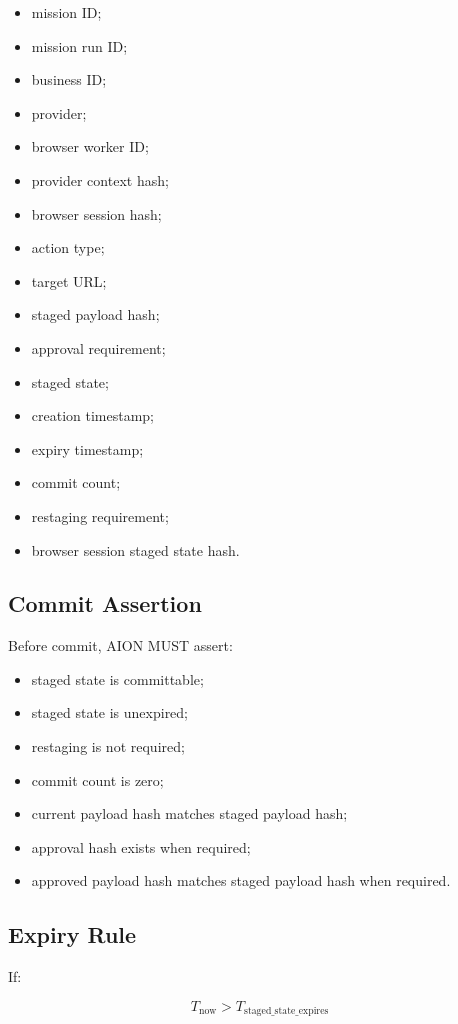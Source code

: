 \begin{itemize}
  \item mission ID;
  \item mission run ID;
  \item business ID;
  \item provider;
  \item browser worker ID;
  \item provider context hash;
  \item browser session hash;
  \item action type;
  \item target URL;
  \item staged payload hash;
  \item approval requirement;
  \item staged state;
  \item creation timestamp;
  \item expiry timestamp;
  \item commit count;
  \item restaging requirement;
  \item browser session staged state hash.
\end{itemize}

\subsection{Commit Assertion}

Before commit, AION MUST assert:

\begin{itemize}
  \item staged state is committable;
  \item staged state is unexpired;
  \item restaging is not required;
  \item commit count is zero;
  \item current payload hash matches staged payload hash;
  \item approval hash exists when required;
  \item approved payload hash matches staged payload hash when required.
\end{itemize}

\subsection{Expiry Rule}

If:

\begin{equation}
T_{\mathrm{now}} > T_{\mathrm{staged\_state\_expires}}
\end{equation}


